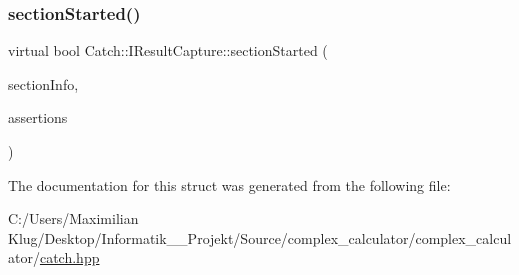 \mbox{\label{struct_catch_1_1_i_result_capture_a5b76ed52badcb64cf374202e12b81a03}} 
\subsubsection{\texorpdfstring{section\+Started()}{sectionStarted()}}
{\footnotesize\ttfamily virtual bool Catch\+::\+I\+Result\+Capture\+::section\+Started (\begin{DoxyParamCaption}\item[{\mbox{\hyperlink{struct_catch_1_1_section_info}{Section\+Info}} const \&}]{section\+Info,  }\item[{\mbox{\hyperlink{struct_catch_1_1_counts}{Counts}} \&}]{assertions }\end{DoxyParamCaption})\hspace{0.3cm}{\ttfamily [pure virtual]}}



The documentation for this struct was generated from the following file\+:\begin{DoxyCompactItemize}
\item 
C\+:/\+Users/\+Maximilian Klug/\+Desktop/\+Informatik\+\_\+\_\+\+Projekt/\+Source/complex\+\_\+calculator/complex\+\_\+calculator/\mbox{\hyperlink{catch_8hpp}{catch.\+hpp}}\end{DoxyCompactItemize}

